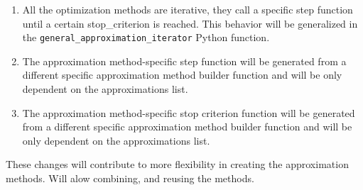 \documentclass[11pt]{article}
\begin{document}
\begin{enumerate}
\def\labelenumi{\arabic{enumi}.}
\item
  All the optimization methods are iterative, they call a specific step
  function until a certain stop\_criterion is reached. This behavior
  will be generalized in the \texttt{general\_approximation\_iterator}
  Python function.
\item
  The approximation method-specific step function will be generated from
  a different specific approximation method builder function and will be
  only dependent on the approximations list.
\item
  The approximation method-specific stop criterion function will be
  generated from a different specific approximation method builder
  function and will be only dependent on the approximations list.
\end{enumerate}

These changes will contribute to more flexibility in creating the
approximation methods. Will alow combining, and reusing the methods.
\end{document}

